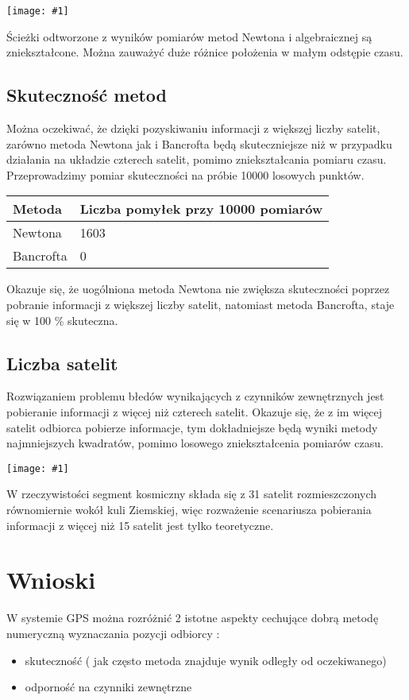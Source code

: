\documentclass{article}
\newcommand{\plot}[1] {
	\texttt{[image: \#1]}
}
\begin{document}
\plot{sciezkipraktyczneall.png}

Ścieżki odtworzone z wyników pomiarów metod Newtona i algebraicznej są zniekształcone. Można zauważyć duże różnice położenia w małym odstępie czasu.

\subsection{Skuteczność metod}
Można oczekiwać, że dzięki pozyskiwaniu informacji z większęj liczby satelit, zarówno metoda Newtona jak i Bancrofta będą skuteczniejsze niż w przypadku działania na układzie czterech satelit, pomimo zniekształcania pomiaru czasu. Przeprowadzimy pomiar skuteczności na próbie 10000 losowych punktów.

\begin{tabular}{ |p{4cm}|p{6cm}|  }
 \hline
 	Metoda  & Liczba pomyłek przy 10000 pomiarów\\
 \hline
  	Newtona & 1603 \\
 \hline
 	Bancrofta & 0 \\
 \hline
\end{tabular}

Okazuje się, że uogólniona metoda Newtona nie zwiększa skuteczności poprzez pobranie informacji z większej liczby satelit, natomiast metoda Bancrofta, staje się w 100 \% skuteczna.


\subsection{Liczba satelit}

Rozwiązaniem problemu błedów wynikających z czynników zewnętrznych jest pobieranie informacji z więcej niż czterech satelit. Okazuje się, że z im więcej satelit odbiorca pobierze informacje, tym dokładniejsze będą wyniki metody najmniejszych kwadratów, pomimo losowego zniekształcenia pomiarów czasu.

\plot{liczbasatelit.png}

W rzeczywistości segment kosmiczny składa się z 31 satelit rozmieszczonych równomiernie wokół kuli Ziemskiej, więc rozważenie scenariusza pobierania informacji z więcej niż 15 satelit jest tylko teoretyczne.

\section{Wnioski}

W systemie GPS można rozróżnić 2 istotne aspekty cechujące dobrą metodę numeryczną wyznaczania pozycji odbiorcy :
\begin{itemize}
	\item skuteczność ( jak często metoda znajduje wynik odległy od oczekiwanego)
	\item odporność na czynniki zewnętrzne
\end{itemize}
\end{document}
